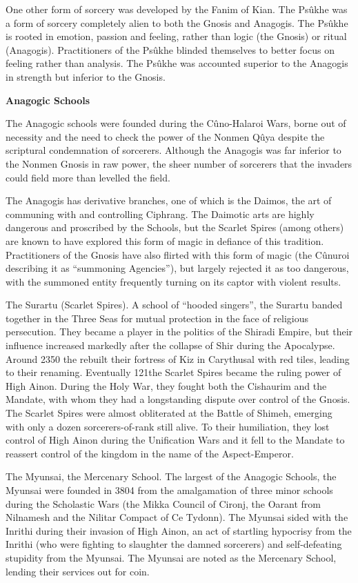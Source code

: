 \documentclass[]{book}
\begin{document}
One other form of sorcery was developed by the Fanim of Kian. The Psûkhe was a form
of sorcery completely alien to both the Gnosis and Anagogis. The Psûkhe is rooted in
emotion, passion and feeling, rather than logic (the Gnosis) or ritual (Anagogis).
Practitioners of the Psûkhe blinded themselves to better focus on feeling rather than
analysis. The Psûkhe was accounted superior to the Anagogis in strength but inferior to
the Gnosis.

\textbf{Anagogic Schools}

The Anagogic schools were founded during the Cûno-Halaroi Wars, borne out of
necessity and the need to check the power of the Nonmen Qûya despite the scriptural
condemnation of sorcerers. Although the Anagogis was far inferior to the Nonmen
Gnosis in raw power, the sheer number of sorcerers that the invaders could field more
than levelled the field.

The Anagogis has derivative branches, one of which is the Daimos, the art of
communing with and controlling Ciphrang. The Daimotic arts are highly dangerous
and proscribed by the Schools, but the Scarlet Spires (among others) are known to have
explored this form of magic in defiance of this tradition. Practitioners of the Gnosis
have also flirted with this form of magic (the Cûnuroi describing it as ``summoning
Agencies''), but largely rejected it as too dangerous, with the summoned entity
frequently turning on its captor with violent results.

The Surartu (Scarlet Spires). A school of ``hooded singers'', the Surartu banded together
in the Three Seas for mutual protection in the face of religious persecution. They
became a player in the politics of the Shiradi Empire, but their influence increased
markedly after the collapse of Shir during the Apocalypse. Around 2350 the rebuilt
their fortress of Kiz in Carythusal with red tiles, leading to their renaming. Eventually
121the Scarlet Spires became the ruling power of High Ainon. During the Holy War, they
fought both the Cishaurim and the Mandate, with whom they had a longstanding
dispute over control of the Gnosis. The Scarlet Spires were almost obliterated at the
Battle of Shimeh, emerging with only a dozen sorcerers-of-rank still alive. To their
humiliation, they lost control of High Ainon during the Unification Wars and it fell to
the Mandate to reassert control of the kingdom in the name of the Aspect-Emperor.

The Myunsai, the Mercenary School. The largest of the Anagogic Schools, the Myunsai
were founded in 3804 from the amalgamation of three minor schools during the
Scholastic Wars (the Mikka Council of Cironj, the Oarant from Nilnamesh and the
Nilitar Compact of Ce Tydonn). The Myunsai sided with the Inrithi during their
invasion of High Ainon, an act of startling hypocrisy from the Inrithi (who were
fighting to slaughter the damned sorcerers) and self-defeating stupidity from the
Myunsai. The Myunsai are noted as the Mercenary School, lending their services out
for coin.
\end{document}
